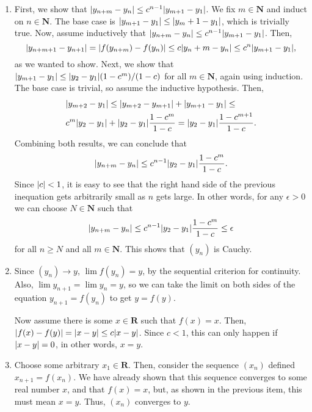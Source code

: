 \documentclass{article}
\DeclarePairedDelimiter\abs{\lvert}{\rvert}
\newcommand{\N}{\mathbf{N}}
\newcommand{\R}{\mathbf{R}}
\begin{document}
\begin{enumerate}
\begin{enumerate}
        \item First, we show that $\abs{y_{n+m}-y_n} \leq c^{n-1}\abs{y_{m+1}-y_1}$. We fix $m \in \N$ and induct on $n \in \N$. The base case is $\abs{y_{m+1}-y_1} \leq \abs{y_m+1-y_1}$, which is trivially true. Now, assume inductively that $\abs{y_{n+m}-y_n} \leq c^{n-1}\abs{y_{m+1}-y_1}$. Then, 
        \begin{equation*}
            \abs{y_{n+m+1} - y_{n+1}} = \abs{f(y_{n+m})-f(y_n)} \leq 
            c \abs{y_n+m-y_n} \leq c^n \abs{y_{m+1}-y_1},
        \end{equation*} as we wanted to show. Next, we show that $\abs{y_{m+1} - y_1} \leq \abs{y_2-y_1} (1-c^m)/(1-c)$ for all $m \in \N$, again using induction. The base case is trivial, so assume the inductive hypothesis. Then, 
        \begin{align*}
            &\abs{y_{m+2}-y_1} \leq \abs{y_{m+2}-y_{m+1}} + \abs{y_{m+1}-y_1} \leq\\
            &c^m \abs{y_2-y_1} + \abs{y_2-y_1} \frac{1-c^m}{1-c} =
            \abs{y_2-y_1} \frac{1-c^{m+1}}{1-c}.
        \end{align*} Combining both results, we can conclude that 
        \begin{equation*}
            \abs{y_{n+m}-y_n} \leq c^{n-1} \abs{y_2-y_1} \frac{1-c^m}{1-c}.
        \end{equation*} Since $\abs{c} < 1$, it is easy to see that the right hand side of the previous inequation gets arbitrarily small as $n$ gets large. In other words, for any $\epsilon > 0$ we can choose $N \in \N$ such that 
        \begin{equation*}
            \abs{y_{n+m}-y_n} \leq c^{n-1} \abs{y_2-y_1} \frac{1-c^m}{1-c} \leq \epsilon
        \end{equation*} for all $n \geq N$ and all $m \in \N$. This shows that $(y_n)$ is Cauchy.
        
        \item Since $(y_n) \to y$, $\lim f(y_n) = y$, by the sequential criterion for continuity. Also, $\lim y_{n+1} = \lim y_n = y$, so we can take the limit on both sides of the equation $y_{n+1} = f(y_n)$ to get $y = f(y)$.
        
        Now assume there is some $x \in \R$ such that $f(x) = x$. Then, $\abs{f(x)-f(y)} = \abs{x-y} \leq c \abs{x-y}$. Since $c < 1$, this can only happen if $\abs{x-y} = 0$, in other words, $x = y$.
        
        \item Choose some arbitrary $x_1 \in \R$. Then, consider the sequence $(x_n)$ defined $x_{n+1} = f(x_n)$. We have already shown that this sequence converges to some real number $x$, and that $f(x) = x$, but, as shown in the previous item, this must mean $x = y$. Thus, $(x_n)$ converges to $y$.
    \end{enumerate} 
    

\end{enumerate}
\end{document}
